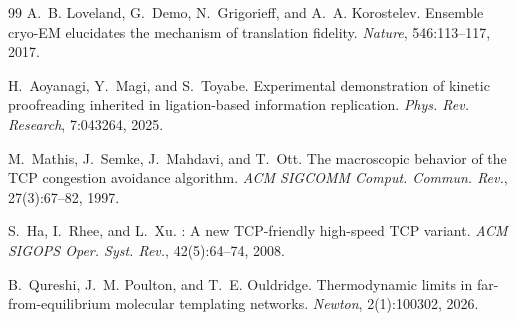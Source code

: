 \documentclass[11pt,twocolumn]{article}
\begin{document}
\begin{thebibliography}{99}
A.~B. Loveland, G.~Demo, N.~Grigorieff, and A.~A. Korostelev.
\newblock Ensemble cryo-EM elucidates the mechanism of translation fidelity.
\newblock \emph{Nature}, 546:113--117, 2017.

H.~Aoyanagi, Y.~Magi, and S.~Toyabe.
\newblock Experimental demonstration of kinetic proofreading inherited in ligation-based information replication.
\newblock \emph{Phys. Rev. Research}, 7:043264, 2025.

M.~Mathis, J.~Semke, J.~Mahdavi, and T.~Ott.
\newblock The macroscopic behavior of the {TCP} congestion avoidance algorithm.
\newblock \emph{ACM SIGCOMM Comput. Commun. Rev.}, 27(3):67--82, 1997.

S.~Ha, I.~Rhee, and L.~Xu.
: A new {TCP}-friendly high-speed {TCP} variant.
\newblock \emph{ACM SIGOPS Oper. Syst. Rev.}, 42(5):64--74, 2008.

B.~Qureshi, J.~M. Poulton, and T.~E. Ouldridge.
\newblock Thermodynamic limits in far-from-equilibrium molecular templating networks.
\newblock \emph{Newton}, 2(1):100302, 2026.

\end{thebibliography}
\end{document}
